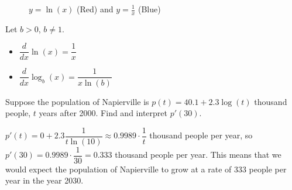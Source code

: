 \begin{figure}[ht!]
\centering
{}
\caption{$y=\ln(x)$ (Red) and $y=\frac{1}{x}$ (Blue)}
\label{fig:2-8-log}
\end{figure} 

\begin{theorem}
    Let $b>0$, $b\neq 1$.
\begin{itemize}
    \item $\dfrac{d}{dx}\ln(x)=\dfrac{1}{x}$
    \item $\dfrac{d}{dx}\log_b(x)=\dfrac{1}{x\ln(b)}$
    \end{itemize}
\end{theorem}

\begin{example} Suppose the population of Napierville is $p(t) = 40.1 + 2.3\log(t)$ thousand people, $t$ years after 2000. Find and interpret $p'(30)$.

\begin{solution} $p'(t) = 0 + 2.3\dfrac{1}{t\ln(10)} \approx 0.9989\cdot \dfrac{1}{t}$ thousand people per year, so $p'(30) = 0.9989\cdot \dfrac{1}{30} = 0.333$ thousand people per year. This means that we would expect the population of Napierville to grow at a rate of 333 people per year in the year 2030.
\end{solution}\end{example}
